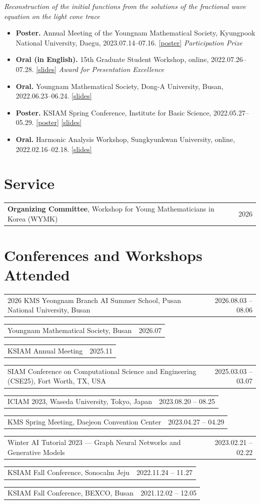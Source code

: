 \documentclass[11pt,a4paper]{article}
\makeatletter
\newcommand{\entry}[2]{\noindent\begin{tabularx}{\textwidth}{@{}Xr@{}}#1 & #2\end{tabularx}\par}
\makeatother
\begin{document}
\vspace{0.6em}
\noindent\emph{Reconstruction of the initial functions from the solutions of the fractional wave equation on the light cone trace}
\begin{itemize}
  \item \textbf{Poster.} Annual Meeting of the Youngnam Mathematical Society,
    Kyungpook National University, Daegu, 2023.07.14--07.16.
    \href{https://github.com/Dabin-Park/Dabin-Park/blob/main/talks/light-cone-trace/2023-07-ynms/poster.pdf}{[poster]} \hfill \emph{Participation Prize}
  \item \textbf{Oral (in English).} 15th Graduate Student Workshop, online, 2022.07.26--07.28.
    \href{https://github.com/Dabin-Park/Dabin-Park/blob/main/talks/light-cone-trace/2022-07-grad-workshop/slides.pdf}{[slides]} \hfill \emph{Award for Presentation Excellence}
  \item \textbf{Oral.} Youngnam Mathematical Society, Dong-A University, Busan, 2022.06.23--06.24.
    \href{https://github.com/Dabin-Park/Dabin-Park/blob/main/talks/light-cone-trace/2022-06-ynms/slides.pdf}{[slides]}
  \item \textbf{Poster.} KSIAM Spring Conference, Institute for Basic Science, 2022.05.27--05.29.
    \href{https://github.com/Dabin-Park/Dabin-Park/blob/main/talks/light-cone-trace/2022-05-ksiam-spring/poster.pdf}{[poster]}
    \href{https://github.com/Dabin-Park/Dabin-Park/blob/main/talks/light-cone-trace/2022-05-ksiam-spring/slides.pdf}{[slides]}
  \item \textbf{Oral.} Harmonic Analysis Workshop, Sungkyunkwan University, online, 2022.02.16--02.18.
    \href{https://github.com/Dabin-Park/Dabin-Park/blob/main/talks/light-cone-trace/2022-02-harmonic-analysis/slides.pdf}{[slides]}
\end{itemize}

\section{Service}

\entry{\textbf{Organizing Committee}, Workshop for Young Mathematicians in Korea (WYMK)}{2026}

\section{Conferences and Workshops Attended}

\entry{2026 KMS Yeongnam Branch AI Summer School, Pusan National University, Busan}{2026.08.03 -- 08.06}
\entry{Youngnam Mathematical Society, Busan}{2026.07}
\entry{KSIAM Annual Meeting}{2025.11}
\entry{SIAM Conference on Computational Science and Engineering (CSE25), Fort Worth, TX, USA}{2025.03.03 -- 03.07}
\entry{ICIAM 2023, Waseda University, Tokyo, Japan}{2023.08.20 -- 08.25}
\entry{KMS Spring Meeting, Daejeon Convention Center}{2023.04.27 -- 04.29}
\entry{Winter AI Tutorial 2023 --- Graph Neural Networks and Generative Models}{2023.02.21 -- 02.22}
\entry{KSIAM Fall Conference, Sonocalm Jeju}{2022.11.24 -- 11.27}
\entry{KSIAM Fall Conference, BEXCO, Busan}{2021.12.02 -- 12.05}
\end{document}

